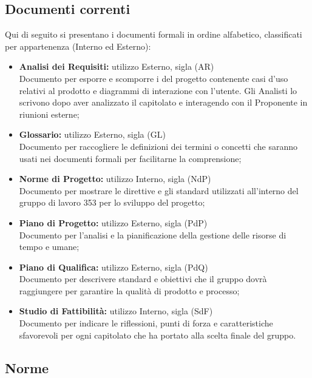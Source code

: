 \documentclass[NormeDiProgetto.tex]{subfiles}
\begin{document}
	\subsection{Documenti correnti}
	Qui di seguito si presentano i documenti formali in ordine alfabetico, classificati per appartenenza (Interno ed Esterno):
	\begin{itemize}
		\item \textbf{Analisi dei Requisiti:} utilizzo Esterno, sigla (AR) \\
		 Documento per esporre e scomporre i  del progetto contenente casi d'uso relativi al prodotto e diagrammi di interazione con l'utente. Gli Analisti lo scrivono dopo aver analizzato il capitolato e interagendo con il Proponente in riunioni esterne;
		
		\item \textbf{Glossario:}
		utilizzo Esterno, sigla (GL) \\
		Documento per raccogliere le definizioni dei termini o concetti che saranno usati nei documenti formali per facilitarne la comprensione;
		
		\item \textbf{Norme di Progetto:}
		utilizzo Interno, sigla (NdP) \\
		Documento per mostrare le direttive e gli standard utilizzati all'interno del gruppo di lavoro 353
		per lo sviluppo del progetto;
		
		\item \textbf{Piano di Progetto:}
		utilizzo Esterno, sigla (PdP) \\
		Documento per l'analisi e la pianificazione della gestione delle risorse di tempo e umane;
		
		\item \textbf{Piano di Qualifica:}
		utilizzo Esterno, sigla (PdQ) \\
		Documento per descrivere standard e obiettivi che il gruppo dovrà raggiungere per garantire la qualità di prodotto e processo;
		
		\item \textbf{Studio di Fattibilità:}
		utilizzo Interno, sigla (SdF) \\
		Documento per indicare le riflessioni, punti di forza e caratteristiche sfavorevoli per ogni capitolato che ha portato alla scelta finale del gruppo.
		
	\end{itemize}
	
	\subsection{Norme}
\end{document}

